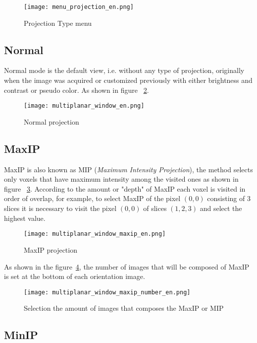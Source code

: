 \begin{figure}[!h]
\centering
\texttt{[image: menu\_projection\_en.png]}
\caption{Projection Type menu}
\label{fig:menu_proj}
\end{figure}

\subsection{Normal}

Normal mode is the default view, i.e. without any type of projection, originally when the image was acquired or customized previously with either brightness and contrast or pseudo color. As shown in figure ~\ref{fig:proj_normal}.

\begin{figure}[!h]
\centering
\texttt{[image: multiplanar\_window\_en.png]}
\caption{Normal projection}
\label{fig:proj_normal}
\end{figure}

\subsection{MaxIP}
\label{sec:max_ip}
MaxIP is also known as MIP (\textit{Maximum Intensity Projection}), the method selects only voxels that have maximum intensity among the visited ones as shown in figure ~\ref{fig:proj_maxip}. According to the amount or "depth" of MaxIP each voxel is visited in order of overlap, for example, to select MaxIP of the pixel $(0,0)$ consisting of 3 slices it is necessary to visit the pixel $(0,0)$ of slices $(1,2,3)$ and select the highest value.

\begin{figure}[!h]
\centering
\texttt{[image: multiplanar\_window\_maxip\_en.png]}
\caption{MaxIP projection}
\label{fig:proj_maxip}
\end{figure}

As shown in the figure~\ref{fig:proj_maxip_qtd}, the number of images that will be composed of MaxIP is set at the bottom of each orientation image.

\begin{figure}[!h]
\centering
\texttt{[image: multiplanar\_window\_maxip\_number\_en.png]}
\caption{Selection the amount of images that composes the MaxIP or MIP}
\label{fig:proj_maxip_qtd}
\end{figure}

\subsection{MinIP}

